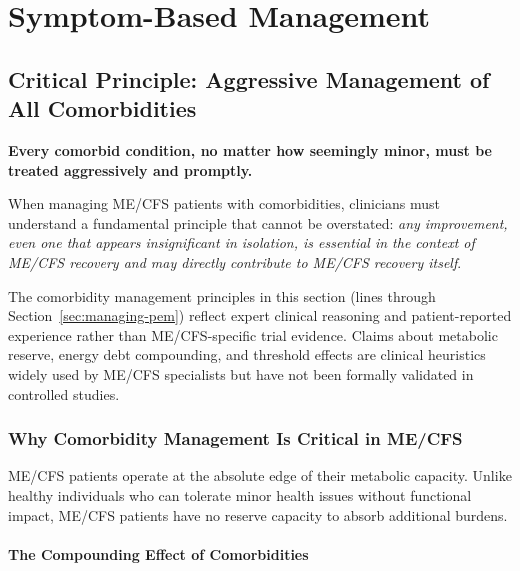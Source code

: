 \chapter{Symptom-Based Management}
\label{ch:symptom-management}

\section{Critical Principle: Aggressive Management of All Comorbidities}
\label{sec:comorbidity-management}

\begin{warning}
\textbf{Every comorbid condition, no matter how seemingly minor, must be treated aggressively and promptly.}

When managing ME/CFS patients with comorbidities, clinicians must understand a fundamental principle that cannot be overstated: \textit{any improvement, even one that appears insignificant in isolation, is essential in the context of ME/CFS recovery and may directly contribute to ME/CFS recovery itself}.
\end{warning}

\begin{limitation}
The comorbidity management principles in this section (lines through Section~\ref{sec:managing-pem}) reflect expert clinical reasoning and patient-reported experience rather than ME/CFS-specific trial evidence. Claims about metabolic reserve, energy debt compounding, and threshold effects are clinical heuristics widely used by ME/CFS specialists but have not been formally validated in controlled studies.
\end{limitation}

\subsection{Why Comorbidity Management Is Critical in ME/CFS}

ME/CFS patients operate at the absolute edge of their metabolic capacity. Unlike healthy individuals who can tolerate minor health issues without functional impact, ME/CFS patients have no reserve capacity to absorb additional burdens.

\subsubsection{The Compounding Effect of Comorbidities}

